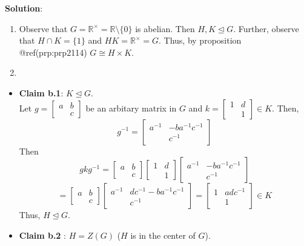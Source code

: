 \documentclass[
]{book}
\begin{document}
\textbf{Solution}:

\begin{enumerate}
\def\labelenumi{(\alph{enumi})}
\item
  Observe that \(G=\mathbb{R}^\times=\mathbb{R}\setminus\{0\}\) is
  abelian. Then \(H,K \trianglelefteq G\). Further, observe that
  \(H\cap K=\{1\}\) and \(HK=\mathbb{R}^\times=G\). Thus, by proposition
  @ref(prp:prp2114) \(G \cong H \times K\).
\item
\end{enumerate}

\begin{itemize}
\item
  \textbf{Claim b.1}: \(K\trianglelefteq G\).\\
  Let \(g = \begin{bmatrix} a & b \\ & c \end{bmatrix}\) be an arbitary
  matrix in \(G\) and
  \(k = \begin{bmatrix} 1 & d \\ & 1 \end{bmatrix}\in K\). Then,
  \[ g^{-1} = \begin{bmatrix}
  a^{-1} & -ba^{-1}c^{-1} \\
  & c^{-1}
  \end{bmatrix}\] Then \[gkg^{-1} = \begin{bmatrix}
  a & b \\
  & c
  \end{bmatrix}\begin{bmatrix}
  1 & d \\
  & 1
  \end{bmatrix}\begin{bmatrix}
  a^{-1} & -ba^{-1}c^{-1} \\
  & c^{-1}
  \end{bmatrix}\] \[= \begin{bmatrix}
  a & b \\
  & c
  \end{bmatrix}\begin{bmatrix}
  a^{-1} & dc^{-1} - ba^{-1}c^{-1} \\
  & c^{-1}
  \end{bmatrix} = \begin{bmatrix}
  1 & adc^{-1} \\
  & 1
  \end{bmatrix} \in K\] Thus, \(H\trianglelefteq G\).
\item
  \textbf{Claim b.2} : \(H=Z(G)\) (\(H\) is in the center of \(G\)).


\end{itemize}
\end{document}
